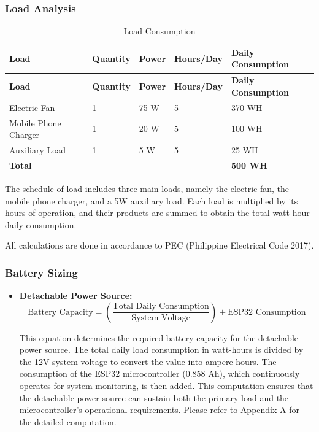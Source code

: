 { \subsubsection{Load Analysis}
 
 \begin{longtable}{p{3cm} p{1.6 cm} p{1.1cm} p{2.1cm} p{4cm}}
 	\caption{Load Consumption} \label{tab:LoadConsumption} \\
 	\toprule
 	\textbf{Load} & \textbf{Quantity} & \textbf{Power} & \textbf{Hours/Day} & \textbf{Daily Consumption} \\
 	\midrule
 	\endfirsthead
 	
 	\toprule
 	\textbf{Load} & \textbf{Quantity} & \textbf{Power} & \textbf{Hours/Day} & \textbf{Daily Consumption} \\
 	\midrule
 	\endhead
 	
 	\bottomrule
 	\endfoot
 	
 	Electric Fan & 1 & 75 W & 5 & 370 WH \\
 	Mobile Phone Charger & 1 & 20 W & 5 & 100 WH \\
 	Auxiliary Load & 1 & 5 W & 5 & 25 WH \\ 
 	\midrule
 	\textbf{Total} & & & & \textbf{500 WH} \\
 \end{longtable}
 
 The schedule of load includes three main loads, namely the electric fan, the mobile phone charger, and a 5W auxiliary load. Each load is multiplied by its hours of operation, and their products are summed to obtain the total watt-hour daily consumption. 
 
 All calculations are done in accordance to PEC (Philippine Electrical Code 2017).
 
 \subsubsection{Battery Sizing}
 
 \begin{itemize}
 	\item\textbf{ Detachable Power Source:} 
 	\begin{equation}
 		\text{Battery Capacity} =
 		\left( \frac{\text{Total Daily Consumption}}{\text{System Voltage}} \right)
 		+ \text{ESP32 Consumption}
 		\label{eq:batterysizing}
 	\end{equation}
 	
 	
 	This equation determines the required battery capacity for the detachable power source. The total daily load consumption in watt-hours is divided by the 12V system voltage to convert the value into ampere-hours. The consumption of the ESP32 microcontroller (0.858 Ah), which continuously operates for system monitoring, is then added. This computation ensures that the detachable power source can sustain both the primary load and the microcontroller’s operational requirements. Please refer to \hyperref[appendix:A]{Appendix A} for the detailed computation.
 	

\end{itemize}}
